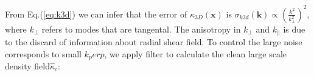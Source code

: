 
From Eq.(\ref{eq:k3d}) we can infer that the error of $\kappa_{3D}(\bm{x})$ is 
$\sigma_{k3d}(\bm{k})\propto(\frac{k^2}{k_\perp^2})^2$, where $k_\perp$ refers to modes that are tangental.
The anisotropy in $k_\perp$ and $k_\parallel$ is due to the discard of information about radial shear field.
To control the large noise corresponds to small $k_perp$, we apply filter to calculate the clean large scale density field$\hat \kappa_c$:
